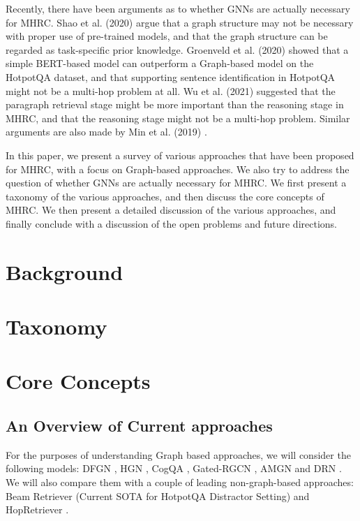 \documentclass[sigplan,screen]{acmart}
\begin{document}
Recently, there have been arguments as to whether GNNs are actually necessary for MHRC. Shao et al. (2020) \cite{RN127} argue that 
a graph structure may not be necessary with proper use of pre-trained models, and that the graph structure can be regarded as task-specific 
prior knowledge. Groenveld et al. (2020) \cite{RN126} showed that a simple BERT-based model can outperform a Graph-based model on the HotpotQA dataset,
and that supporting sentence identification in HotpotQA might not be a multi-hop problem at all. Wu et al. (2021) \cite{RN106} suggested that
the paragraph retrieval stage might be more important than the reasoning stage in MHRC, and that the reasoning stage might not be a multi-hop problem.
Similar arguments are also made by Min et al. (2019) \cite{RN150}.

In this paper, we present a survey of various approaches that have been proposed for MHRC, with a focus on Graph-based approaches. We also try to
address the question of whether GNNs are actually necessary for MHRC. We first present a taxonomy of the various approaches, and then discuss the
core concepts of MHRC. We then present a detailed discussion of the various approaches, and finally conclude with a discussion of the open problems 
and future directions.

\section{Background}

\section{Taxonomy}

\section{Core Concepts}
\subsection{An Overview of Current approaches}
For the purposes of understanding Graph based approaches, we will consider the following models:
DFGN \cite{RN122}, HGN \cite{RN119}, CogQA \cite{RN118}, Gated-RGCN \cite{RN91}, AMGN \cite{RN131} and DRN \cite{RN142}. We will also compare them with 
a couple of leading non-graph-based approaches: Beam Retriever \cite{RN105} (Current SOTA for HotpotQA Distractor Setting) and
HopRetriever \cite{RN149}.
\end{document}
